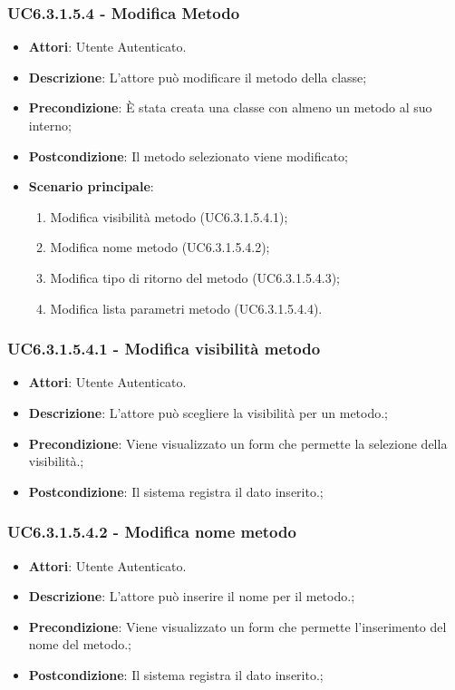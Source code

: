 \subsubsection{UC6.3.1.5.4 - Modifica Metodo} 
\label{sssec:UC6.3.1.5.4} 
\begin{itemize} 
\item \textbf{Attori}: Utente Autenticato.
\item \textbf{Descrizione}: L'attore può modificare il metodo della classe;
\item \textbf{Precondizione}: È stata creata una classe con almeno un metodo al suo interno;
\item \textbf{Postcondizione}: Il metodo selezionato viene modificato;
\item \textbf{Scenario principale}: \begin{enumerate}\item Modifica visibilità metodo (UC6.3.1.5.4.1);\item Modifica nome metodo (UC6.3.1.5.4.2);\item Modifica tipo di ritorno del metodo (UC6.3.1.5.4.3);\item Modifica lista parametri metodo (UC6.3.1.5.4.4). 
 \end{enumerate}
\end{itemize} 
\subsubsection{UC6.3.1.5.4.1 - Modifica visibilità metodo} 
\label{sssec:UC6.3.1.5.4.1} 
\begin{itemize} 
\item \textbf{Attori}: Utente Autenticato.
\item \textbf{Descrizione}: L'attore può scegliere la visibilità per un metodo.;
\item \textbf{Precondizione}: Viene visualizzato un form che permette la selezione della visibilità.;
\item \textbf{Postcondizione}: Il sistema registra il dato inserito.;
\end{itemize} 
\subsubsection{UC6.3.1.5.4.2 - Modifica nome metodo} 
\label{sssec:UC6.3.1.5.4.2} 
\begin{itemize} 
\item \textbf{Attori}: Utente Autenticato.
\item \textbf{Descrizione}: L'attore può inserire il nome per il metodo.;
\item \textbf{Precondizione}: Viene visualizzato un form che permette l'inserimento del nome del metodo.;
\item \textbf{Postcondizione}: Il sistema registra il dato inserito.;
\end{itemize} 
